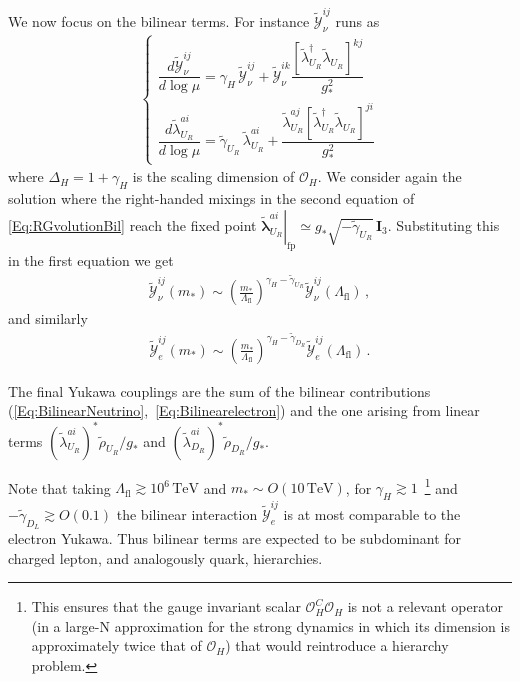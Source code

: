 \documentclass[aps,prl,twocolumn,showpacs,10pt,preprintnumbers,nofootinbib]{revtex4-2}
\newcommand{\TeV}{\,\mathrm{TeV}}
\newcommand{\gst}{g_*}
\newcommand{\mst}{m_*}
\newcommand{\Lfl}{\Lambda_{\text{fl}}}
\newcommand{\LL}{\tilde{\lambda}}
\newcommand{\tg}{\tilde{\gamma}}
\newcommand{\fp}[1]{{\left.#1\right|_{\text{fp}}}}
\newcommand{\op}{\mathcal{O}}
\begin{document}
{We now focus on the bilinear terms. For instance $\tilde{\mathcal{Y}}_{\nu}^{ij}$ runs as 
\begin{align}\label{Eq:RGvolutionBil}
\begin{cases}
    \dfrac{d \tilde{\mathcal{Y}}_{\nu}^{ij}}{d \log \mu} =  
    \gamma_H\, \tilde{\mathcal{Y}}_{\nu}^{ij}
    + \tilde{\mathcal{Y}}_{\nu}^{ik} \dfrac{[\LL_{U_R}^{\dagger} \LL_{U_R}]^{kj}}{\gst^2} \\[10pt]
    \dfrac{d \LL_{U_R}^{ai}}{d \log \mu} = 
    \tilde{\gamma}_{U_R}\, \LL_{U_R}^{ai}
    + \dfrac{\LL_{U_R}^{aj} \left[ \LL_{U_R}^{\dagger} \LL_{U_R} \right]^{ji}}{\gst^2} 
\end{cases}
\end{align}
where $\Delta_H= 1+\gamma_H$ is the scaling dimension of $\op_H$. We consider again the solution where the right-handed mixings in the second equation of \eqref{Eq:RGvolutionBil} reach the fixed point $\fp{\boldsymbol{\LL}_{U_R}^{ai}} \simeq \gst \sqrt{-\tilde{\gamma}_{U_R}}\,\mathbf{I}_3$. Substituting this in the first equation we get
\begin{align}\label{Eq:BilinearNeutrino}
    \tilde{\mathcal{Y}}_{\nu}^{ij} (\mst) \sim  \left( \frac{\mst}{\Lfl}\right)^{\gamma_H -\tg_{U_R}}\tilde{\mathcal{Y}}_{\nu}^{ij} (\Lfl)\,,
\end{align}
and similarly 
\begin{align}\label{Eq:Bilinearelectron}
    \tilde{\mathcal{Y}}_{e}^{ij} (\mst) \sim  \left( \frac{\mst}{\Lfl}\right)^{\gamma_H -\tg_{D_R}}\tilde{\mathcal{Y}}_{e}^{ij} (\Lfl)\,.
\end{align}

The final Yukawa couplings are the sum of the bilinear contributions (\ref{Eq:BilinearNeutrino},~\ref{Eq:Bilinearelectron}) and the one arising from linear terms $(\tilde{\lambda}_{U_R}^{ai})^* \tilde{\rho}_{U_R}/\gst$ and $(\tilde{\lambda}_{D_R}^{ai})^* \tilde{\rho}_{D_R}/\gst$.

Note that taking $\Lfl\gtrsim 10^{6}\TeV$ and $\mst\sim O(10\TeV)$, for $\gamma_H\gtrsim 1$~\footnote{This ensures that the gauge invariant scalar $\op_H^C\op_H$ is not a relevant operator (in a large-N approximation for the strong dynamics in which its dimension is approximately twice that of $\op_H$) that would reintroduce a hierarchy problem.} and $-\tilde{\gamma}_{D_L}\gtrsim O(0.1)$ the bilinear interaction $\tilde{\mathcal{Y}}_e^{ij}$ is at most comparable to the electron Yukawa. Thus bilinear terms are expected to be subdominant for charged lepton, and analogously quark, hierarchies.

}
\end{document}
